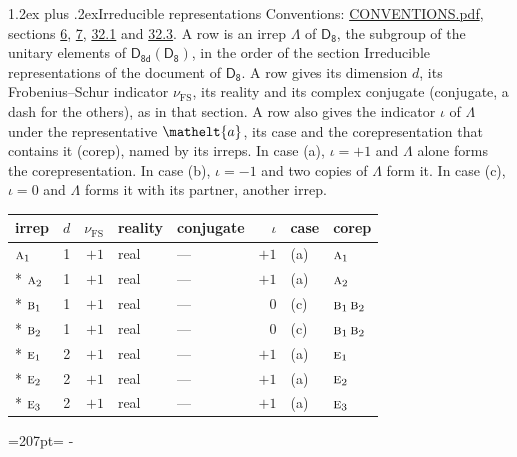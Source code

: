 \documentclass[10pt,a4paper]{article}
\makeatletter
\renewcommand\section{\@startsection{section}{1}{\z@}{-3ex plus -1ex minus -.2ex}%
  {1.2ex plus .2ex}{\normalfont\large\sffamily\bfseries\color{parttitle}}}
\newcommand{\needspace}[1]{\par\penalty-100\begingroup\dimen0=#1\relax\dimen2=\pagegoal
  \advance\dimen2-\pagetotal\ifdim\dimen0>\dimen2\relax\ifdim\dimen2>0pt\vfil\break\fi\fi
  \endgroup}
\numberwithin{equation}{section}
\newcommand{\eltfont}[1]{{\let\sigma\eltsigma\mathelt{#1}}}
\newcommand{\grp}[1]{\mathsf{#1}}
\newcommand{\irr}[1]{\text{\normalfont\scshape #1}}
\newcommand{\elt}[1]{\eltfont{#1}}
\newcommand{\fsind}{\nu_{\mathrm{FS}}}
\makeatother
\begin{document}
\section{Irreducible representations}\label{s:irreps}
Conventions: \href{../../CONVENTIONS.pdf}{CONVENTIONS.pdf}, sections \href{../../../rotation/CONVENTIONS.pdf\#conv.6}{6}, \href{../../../rotation/CONVENTIONS.pdf\#conv.7}{7}, \href{../../CONVENTIONS.pdf\#conv.32.1}{32.1} and \href{../../CONVENTIONS.pdf\#conv.32.3}{32.3}.
\leavevmode\label{n:irrep.Delta}A row is an irrep $\Lambda$ of $\grp{D_{8}}$, the subgroup of the unitary elements of $\grp{D_{8d}}(\grp{D_{8}})$, in the order of the section Irreducible representations of the document of \href{../../../rotation/data/pdf/D8.pdf}{$\grp{D_{8}}$}. \label{n:index.dimension}\label{n:index.frobenius}\label{n:head.irrep}\label{n:head.reality}\label{n:head.conjugate}A row gives its dimension $d$, its Frobenius--Schur indicator $\fsind$, its reality and its complex conjugate (conjugate, a dash for the others), as in that section. \label{n:head.case.corep}\label{n:head.corep}A row also gives the indicator $\iota$ of $\Lambda$ under the representative $\elt{a}$, its case and the corepresentation that contains it (corep), named by its irreps. In case (a), $\iota = +1$ and $\Lambda$ alone forms the corepresentation. In case (b), $\iota = -1$ and two copies of $\Lambda$ form it. In case (c), $\iota = 0$ and $\Lambda$ forms it with its partner, another irrep.
\setlength{\emergencystretch}{2em}\par\setlength{\emergencystretch}{0pt}
{\small\renewcommand{\arraystretch}{1.25}\setlength{\tabcolsep}{4pt}\begin{longtable}{@{}lrrllrll@{}}\toprule
irrep & $d$ & $\fsind$ & reality & conjugate & $\iota$ & case & corep\\\midrule\endhead
\bottomrule\endfoot\endlastfoot
$\irr{a}_{1}$ & 1 & $+1$ & real & --- & $+1$ & (a) & $\irr{a}_{1}$\\*
$\irr{a}_{2}$ & 1 & $+1$ & real & --- & $+1$ & (a) & $\irr{a}_{2}$\\*
$\irr{b}_{1}$ & 1 & $+1$ & real & --- & $0$ & (c) & $\irr{b}_{1}\,\irr{b}_{2}$\\*
$\irr{b}_{2}$ & 1 & $+1$ & real & --- & $0$ & (c) & $\irr{b}_{1}\,\irr{b}_{2}$\\*
$\irr{e}_{1}$ & 2 & $+1$ & real & --- & $+1$ & (a) & $\irr{e}_{1}$\\*
$\irr{e}_{2}$ & 2 & $+1$ & real & --- & $+1$ & (a) & $\irr{e}_{2}$\\*
$\irr{e}_{3}$ & 2 & $+1$ & real & --- & $+1$ & (a) & $\irr{e}_{3}$\\
\bottomrule\end{longtable}}
\needspace{207pt}
\end{document}

